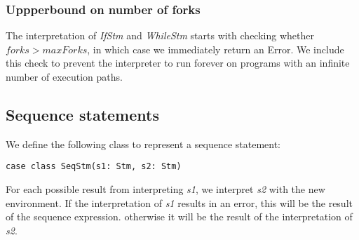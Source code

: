 \subsubsection{Uppperbound on number of forks}

The interpretation of \textsl{IfStm} and \textsl{WhileStm} starts with checking whether $forks > maxForks$, in which case we immediately return an Error. We include this check to prevent the interpreter to run forever on programs with an infinite number of execution paths. 

\subsection{Sequence statements}

We define the following class to represent a sequence statement:
\begin{lstlisting}[style=simple]
	case class SeqStm(s1: Stm, s2: Stm)
\end{lstlisting}
For each possible result from interpreting \textsl{s1}, we interpret \textsl{s2} with the new environment. If the interpretation of \textsl{s1} results in an error, this will be the result of the sequence expression. otherwise it will be the result of the interpretation of \textsl{s2}. 	
